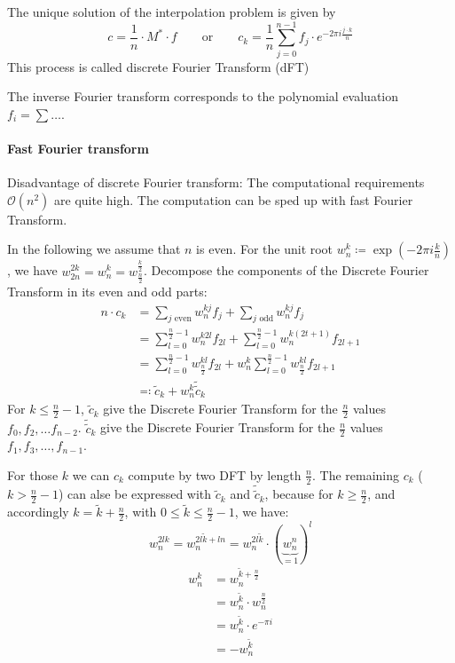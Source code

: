 \documentclass[a4paper]{article}
\numberwithin{lecref}{section}
\theoremstyle{break}
\begin{document}
The unique solution of the interpolation problem is given by
\[ c = \frac1n \cdot M^* \cdot f \qquad \text{or} \qquad c_k = \frac 1n \sum_{j=0}^{n-1} f_j \cdot e^{-2 \pi i \frac{j \cdot k}{n}} \]
This process is called discrete Fourier Transform (dFT)

The inverse Fourier transform corresponds to the polynomial evaluation $f_i = \sum \dots$.

\paragraph{Fast Fourier transform}

Disadvantage of discrete Fourier transform: The computational requirements $\mathcal O(n^2)$ are quite high. The computation can be sped up with fast Fourier Transform.

In the following we assume that $n$ is even.
For the unit root $w_n^k \coloneqq \exp(-2 \pi i \frac kn)$, we have $w_{2n}^{2k} = w_n^k = w_{\frac n2}^{\frac k2}$. Decompose the components of the Discrete Fourier Transform in its even and odd parts:
\begin{align*}
  n \cdot c_k
    &= \sum_{j \text{ even}} w_n^{kj} f_j + \sum_{j \text{ odd}} w_n^{kj} f_j \\
    &= \sum_{l=0}^{\frac n2 - 1} w_n^{k2l} f_{2l} + \sum_{l=0}^{\frac n2 - 1} w_n^{k(2t + 1)} f_{2l + 1} \\
    &= \sum_{l=0}^{\frac n2 - 1} w_{\frac n2}^{kl} f_{2l} + w_n^k \sum_{l=0}^{\frac n2 - 1} w_{\frac n2}^{kl} f_{2l+1} \\
    &\eqqcolon \tilde c_k + w_n^k \tilde{\tilde c}_k
\end{align*}
For $k \leq \frac n2 - 1$, $\tilde c_k$ give the Discrete Fourier Transform for the $\frac n2$ values $f_0, f_2, \dots f_{n-2}$. $\tilde{\tilde{c}}_k$ give the Discrete Fourier Transform for the $\frac n2$ values $f_1, f_3, \dots, f_{n-1}$.

For those $k$ we can $c_k$ compute by two DFT by length $\frac n2$. The remaining $c_k$ ($k > \frac n2 - 1$) can alse be expressed with $\tilde c_k$ and $\tilde{\tilde{c}}_k$, because for $k \geq \frac n2$, and accordingly $k = \tilde k + \frac n2$, with $0 \leq \tilde k \leq \frac n2 - 1$, we have:
\[ w_{n}^{2lk} = w_{n}^{2l\tilde k + ln} = w_n^{2l\tilde k} \cdot (\underbrace{w_n^n}_{= 1})^l \]
\begin{align*}
  w_n^k &= w_n^{\tilde k + \frac n2} \\
    &= w_n^{\tilde k} \cdot w_n^{\frac n2} \\
    &= w_n^{\tilde k} \cdot e^{-\pi i} \\
    &= -w_n^{\tilde k}
\end{align*}
\end{document}
